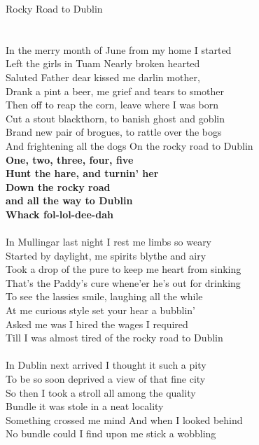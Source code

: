 \documentclass[letterpaper,9pt]{article}
\begin{document}
\newpage
{}
\huge
Rocky Road to Dublin\\
\\
\LARGE
\noindent
\\In the merry month of June from my home I started
\\Left the girls in Tuam Nearly broken hearted
\\Saluted Father dear kissed me darlin mother,
\\Drank a pint a beer, me grief and tears to smother
\\Then off to reap the corn, leave where I was born
\\Cut a stout blackthorn, to banish ghost and goblin
\\Brand new pair of brogues, to rattle over the bogs
\\And frightening all the dogs On the rocky road to Dublin
\\\textbf{One, two, three, four, five
\\Hunt the hare, and turnin' her
\\Down the rocky road
\\and all the way to Dublin
\\Whack fol-lol-dee-dah}
\\
\\In Mullingar last night I rest me limbs so weary
\\Started by daylight, me spirits blythe and airy
\\Took a drop of the pure to keep me heart from sinking
\\That's the Paddy's cure whene'er he's out for drinking
\\To see the lassies smile, laughing all the while
\\At me curious style set your hear a bubblin'
\\Asked me was I hired the wages I required
\\Till I was almost tired of the rocky road to Dublin
\\
\newpage
\noindent
\\In Dublin next arrived I thought it such a pity
\\To be so soon deprived a view of that fine city
\\So then I took a stroll all among the quality
\\Bundle it was stole in a neat locality
\\Something crossed me mind And when I looked behind
\\No bundle could I find upon me stick a wobbling
\end{document}
